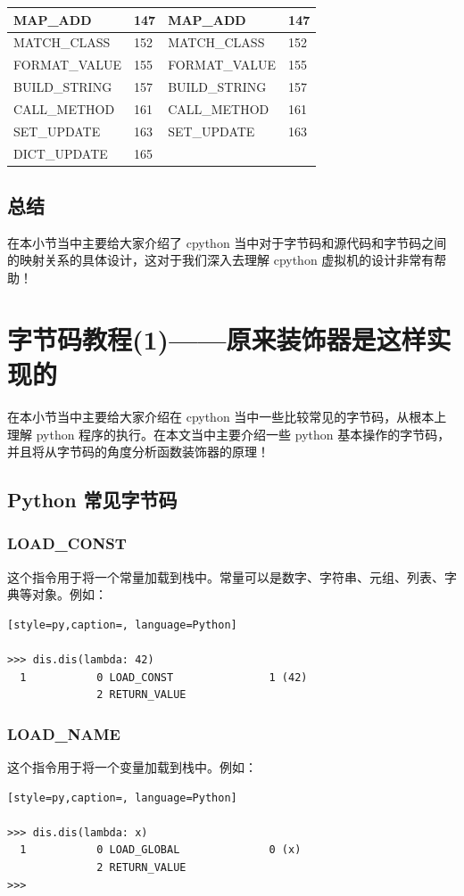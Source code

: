 \begin{table}[H]
\begin{tabular}{|l|l|l|l|}
      MAP\_ADD & 147 &MAP\_ADD & 147 \\ \hline
      MATCH\_CLASS & 152 &MATCH\_CLASS & 152 \\ \hline
      FORMAT\_VALUE & 155 &FORMAT\_VALUE & 155 \\ \hline
      BUILD\_STRING & 157 &BUILD\_STRING & 157 \\ \hline
      CALL\_METHOD & 161 &CALL\_METHOD & 161 \\ \hline
      SET\_UPDATE & 163 &SET\_UPDATE & 163 \\ \hline
      DICT\_UPDATE & 165 & & \\ \hline
        \end{tabular}
\end{table}
\subsection{总结}
在本小节当中主要给大家介绍了 cpython 当中对于字节码和源代码和字节码之间的映射关系的具体设计，这对于我们深入去理解 cpython 虚拟机的设计非常有帮助！

\section{字节码教程(1)——原来装饰器是这样实现的}
在本小节当中主要给大家介绍在 cpython 当中一些比较常见的字节码，从根本上理解 python 程序的执行。在本文当中主要介绍一些 python 基本操作的字节码，并且将从字节码的角度分析函数装饰器的原理！
\subsection{Python 常见字节码}
\subsubsection{LOAD\_CONST}
这个指令用于将一个常量加载到栈中。常量可以是数字、字符串、元组、列表、字典等对象。例如：
\begin{lstlisting}[style=py,caption=, language=Python]

>>> dis.dis(lambda: 42)
  1           0 LOAD_CONST               1 (42)
              2 RETURN_VALUE
\end{lstlisting}
\subsubsection{LOAD\_NAME}
这个指令用于将一个变量加载到栈中。例如：
\begin{lstlisting}[style=py,caption=, language=Python]

>>> dis.dis(lambda: x)
  1           0 LOAD_GLOBAL              0 (x)
              2 RETURN_VALUE
>>>
\end{lstlisting}
